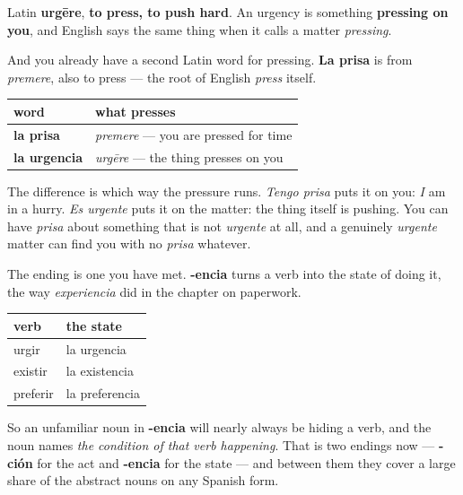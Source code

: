 \begin{cousinweb}
Latin \textbf{urgēre}, \textbf{to press, to push hard}. An urgency is something \textbf{pressing on you}, and English says the same thing when it calls a matter \emph{pressing}.

And you already have a second Latin word for pressing. \textbf{La prisa} is from \emph{premere}, also to press — the root of English \emph{press} itself.

\noindent
\begin{tabularx}{\linewidth}{@{}>{\raggedright\arraybackslash}X>{\raggedright\arraybackslash}X@{}}
\toprule
\textbf{word} & \textbf{what presses} \\
\midrule
\textbf{la prisa} & \emph{premere} — you are pressed for time \\
\textbf{la urgencia} & \emph{urgēre} — the thing presses on you \\
\bottomrule
\end{tabularx}

The difference is which way the pressure runs. \emph{Tengo prisa} puts it on you: \emph{I} am in a hurry. \emph{Es urgente} puts it on the matter: the thing itself is pushing. You can have \emph{prisa} about something that is not \emph{urgente} at all, and a genuinely \emph{urgente} matter can find you with no \emph{prisa} whatever.
\end{cousinweb}

\begin{culture}
The ending is one you have met. \textbf{-encia} turns a verb into the state of doing it, the way \emph{experiencia} did in the chapter on paperwork.

\noindent
\begin{tabularx}{\linewidth}{@{}>{\raggedright\arraybackslash}X>{\raggedright\arraybackslash}X@{}}
\toprule
\textbf{verb} & \textbf{the state} \\
\midrule
urgir & la urgencia \\
existir & la existencia \\
preferir & la preferencia \\
\bottomrule
\end{tabularx}

So an unfamiliar noun in \textbf{-encia} will nearly always be hiding a verb, and the noun names \emph{the condition of that verb happening}. That is two endings now — \textbf{-ción} for the act and \textbf{-encia} for the state — and between them they cover a large share of the abstract nouns on any Spanish form.
\end{culture}

